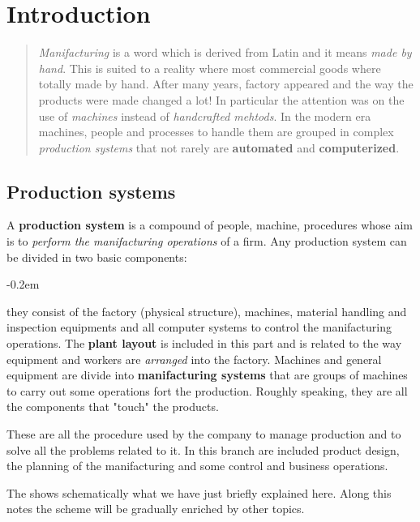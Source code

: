 \chapter{Introduction}
\vspace{-0.5cm}
\minitoc 

\begin{quotation}
    \noindent
    \textsf{\textit{Manifacturing} is a word which is derived from Latin and it means \textit{made by hand}. This is suited to a reality where most commercial goods where totally made by hand. After many years, factory appeared and the way the products were made changed a lot! In particular the attention was on the use of \textit{machines} instead of \textit{handcrafted mehtods}. In the modern era machines, people and processes to handle them are grouped in complex \textit{production systems} that not rarely are \textbf{automated} and \textbf{computerized}.  
    }
\end{quotation}

\section{Production systems}
A \textbf{production system} is a compound of people, machine, procedures whose aim is to \textit{perform the manifacturing operations} of a firm. Any production system can be divided in two basic components: 
\begin{description}
    \itemsep-0.2em
    \item[\textsc{Facilities}] they consist of the factory (physical structure), machines, material handling and inspection equipments and all computer systems to control the manifacturing operations. The \textbf{plant layout} is included in this part and is related to the way equipment and workers are \textit{arranged} into the factory. Machines and general equipment are divide into \textbf{manifacturing systems} that are groups of machines to carry out some operations fort the production. Roughly speaking, they are all the components that "touch" the products.
    \item[\textsc{Manifacturing support systems}]  These are all the procedure used by the company to manage production and to solve all the problems related to it. In this branch are included product design, the planning of the manifacturing and some control and business operations.
\end{description}
\noindent
The   shows schematically what we have just briefly explained here. Along this notes the scheme will be gradually enriched by other topics. 


